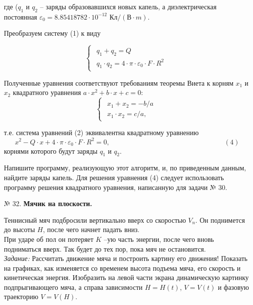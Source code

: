 где ($q_1$ и $q_2$ -- заряды образовавшихся новых капель, 
а диэлектрическая постоянная
 $\varepsilon_0=8.85418782\cdot 10^{-12}$ $\text{Кл}/(\text{В}\cdot m).$

Преобразуем систему (1) к виду  

\begin{equation}
 \begin{cases}
 \begin{aligned}
   q_1 + q_2 = Q\\
   q_1\cdot q_2 = {4\cdot\pi\cdot\varepsilon_0}\cdot F\cdot R^2
      \end{aligned}
 \end{cases}
\end{equation}

Полученные уравнения соответствуют требованиям теоремы Виета к корням $x_1$ и $x_2$ квадратного уравнения 
$a\cdot x^2 + b\cdot x +c = 0:$
\begin{equation}
 \begin{cases}
  \begin{aligned}
   x_1 + x_2 = -b/a\\
   x_1\cdot x_2 = c/a, 
      \end{aligned}
 \end{cases}
\end{equation}

т.е. система уравнений (2) эквивалентна квадратному уравнению
$$x^2 - Q\cdot x + 4\cdot\pi\cdot\varepsilon_0\cdot F\cdot R^2 = 0,  \hspace{200pt} (4)$$
    корнями которого будут заряды $q_1$ и $q_2$.
 
Напишите программу, реализующую этот алгоритм, и, по приведенным данным, найдите заряды капель. Для решения уравнения (4) следует использовать программу решения квадратного уравнения, написанную для задачи № 30.

№ 32. {\bf Мячик на плоскости.}

Теннисный мяч подбросили вертикально вверх со скоростью $V_n$. Он поднимется до высоты $H$, после чего начнет падать вниз.\\
При ударе об пол он потеряет $K$ --ую часть энергии, после чего вновь подниматься вверх. Так будет до тех пор, пока мяч не остановится.\\
{\em Задание:} Рассчитать движение мяча и построить картину его движения! Показать на графиках, как изменяется со временем высота подъема мяча, его скорость и кинетическая энергия. Изобразить на левой части экрана динамическую картинку подпрыгивающего мяча, а справа зависимости  $H= H(t)$, $V= V(t)$ и фазовую траекторию $V= V(H)$.

